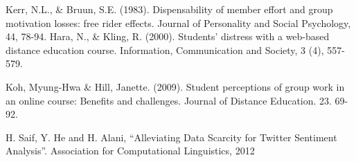 \documentclass[letterpaper%
, twoside%
, 12pt%
,these%
, english%
,creativecommons,hyperref, withAlgo2e %
]{thETS}
\begin{document}
\begin{thebibliography}{01}
Kerr, N.L., \& Bruun, S.E. (1983). Dispensability of member effort and group motivation losses: free rider effects.
Journal of Personality and Social Psychology, 44, 78-94. 
Hara, N., \& Kling, R. (2000). Students' distress with a web-based distance education course. Information,
Communication and Society, 3 (4), 557-579. 


 Koh, Myung-Hwa \& Hill, Janette. (2009). Student perceptions of group work in an online course: Benefits and challenges. Journal of Distance Education. 23. 69-92. 

H. Saif, Y. He and H. Alani, “Alleviating Data Scarcity for Twitter
Sentiment Analysis”. Association for Computational Linguistics, 2012
\end{thebibliography}

\end{document}
